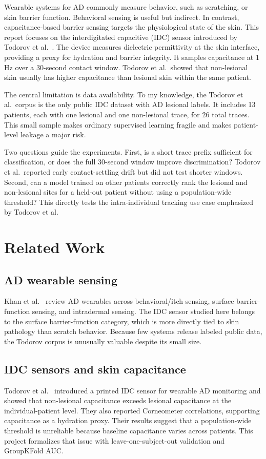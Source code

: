 \documentclass[acmtog]{acmart}
\begin{document}
Wearable systems for AD commonly measure behavior, such as scratching, or skin
barrier function. Behavioral sensing is useful but indirect. In contrast,
capacitance-based barrier sensing targets the physiological state of the skin.
This report focuses on the interdigitated capacitive (IDC) sensor introduced by
Todorov et al.\ \cite{todorov2025wearable}. The device measures dielectric
permittivity at the skin interface, providing a proxy for hydration and barrier
integrity. It samples capacitance at 1\,Hz over a 30-second contact window.
Todorov et al.\ showed that non-lesional skin usually has higher capacitance
than lesional skin within the same patient.

The central limitation is data availability. To my knowledge, the Todorov et al.\
corpus is the only public IDC dataset with AD lesional labels. It includes 13
patients, each with one lesional and one non-lesional trace, for 26 total traces.
This small sample makes ordinary supervised learning fragile and makes
patient-level leakage a major risk.

Two questions guide the experiments. First, is a short trace prefix sufficient
for classification, or does the full 30-second window improve discrimination?
Todorov et al.\ reported early contact-settling drift but did not test shorter
windows. Second, can a model trained on other patients correctly rank the
lesional and non-lesional sites for a held-out patient without using a
population-wide threshold? This directly tests the intra-individual tracking use
case emphasized by Todorov et al.

\section{Related Work}\label{sec:related}

\subsection*{AD wearable sensing}
Khan et al.\ \cite{khan2024skin} review AD wearables across behavioral/itch
sensing, surface barrier-function sensing, and intradermal sensing. The IDC
sensor studied here belongs to the surface barrier-function category, which is
more directly tied to skin pathology than scratch behavior. Because few systems
release labeled public data, the Todorov corpus is unusually valuable despite
its small size.

\subsection*{IDC sensors and skin capacitance}
Todorov et al.\ \cite{todorov2025wearable} introduced a printed IDC sensor for
wearable AD monitoring and showed that non-lesional capacitance exceeds
lesional capacitance at the individual-patient level. They also reported
Corneometer correlations, supporting capacitance as a hydration proxy. Their
results suggest that a population-wide threshold is unreliable because baseline
capacitance varies across patients. This project formalizes that issue with
leave-one-subject-out validation and GroupKFold AUC.
\end{document}
